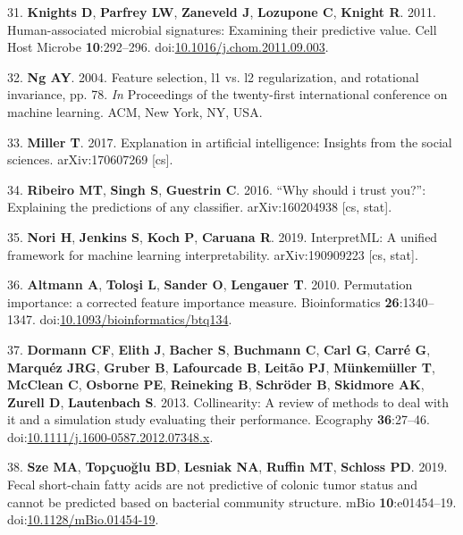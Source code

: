 \documentclass[11pt,]{article}
\begin{document}
\hypertarget{ref-knights_human-associated_2011}{}
31. \textbf{Knights D}, \textbf{Parfrey LW}, \textbf{Zaneveld J},
\textbf{Lozupone C}, \textbf{Knight R}. 2011. Human-associated microbial
signatures: Examining their predictive value. Cell Host Microbe
\textbf{10}:292--296.
doi:\href{https://doi.org/10.1016/j.chom.2011.09.003}{10.1016/j.chom.2011.09.003}.

\hypertarget{ref-Ng:2004:FSL:1015330.1015435}{}
32. \textbf{Ng AY}. 2004. Feature selection, l1 vs. l2 regularization,
and rotational invariance, pp. 78. \emph{In} Proceedings of the
twenty-first international conference on machine learning. ACM, New
York, NY, USA.

\hypertarget{ref-miller_explanation_2017}{}
33. \textbf{Miller T}. 2017. Explanation in artificial intelligence:
Insights from the social sciences. arXiv:170607269 {[}cs{]}.

\hypertarget{ref-ribeiro_why_2016}{}
34. \textbf{Ribeiro MT}, \textbf{Singh S}, \textbf{Guestrin C}. 2016.
``Why should i trust you?'': Explaining the predictions of any
classifier. arXiv:160204938 {[}cs, stat{]}.

\hypertarget{ref-nori_interpretml:_2019}{}
35. \textbf{Nori H}, \textbf{Jenkins S}, \textbf{Koch P},
\textbf{Caruana R}. 2019. InterpretML: A unified framework for machine
learning interpretability. arXiv:190909223 {[}cs, stat{]}.

\hypertarget{ref-10.1093ux2fbioinformaticsux2fbtq134}{}
36. \textbf{Altmann A}, \textbf{Toloşi L}, \textbf{Sander O},
\textbf{Lengauer T}. 2010. Permutation importance: a corrected feature
importance measure. Bioinformatics \textbf{26}:1340--1347.
doi:\href{https://doi.org/10.1093/bioinformatics/btq134}{10.1093/bioinformatics/btq134}.

\hypertarget{ref-dormann_collinearity:_2013}{}
37. \textbf{Dormann CF}, \textbf{Elith J}, \textbf{Bacher S},
\textbf{Buchmann C}, \textbf{Carl G}, \textbf{Carré G}, \textbf{Marquéz
JRG}, \textbf{Gruber B}, \textbf{Lafourcade B}, \textbf{Leitão PJ},
\textbf{Münkemüller T}, \textbf{McClean C}, \textbf{Osborne PE},
\textbf{Reineking B}, \textbf{Schröder B}, \textbf{Skidmore AK},
\textbf{Zurell D}, \textbf{Lautenbach S}. 2013. Collinearity: A review
of methods to deal with it and a simulation study evaluating their
performance. Ecography \textbf{36}:27--46.
doi:\href{https://doi.org/10.1111/j.1600-0587.2012.07348.x}{10.1111/j.1600-0587.2012.07348.x}.

\hypertarget{ref-sze_fecal_2019}{}
38. \textbf{Sze MA}, \textbf{Topçuoğlu BD}, \textbf{Lesniak NA},
\textbf{Ruffin MT}, \textbf{Schloss PD}. 2019. Fecal short-chain fatty
acids are not predictive of colonic tumor status and cannot be predicted
based on bacterial community structure. mBio \textbf{10}:e01454--19.
doi:\href{https://doi.org/10.1128/mBio.01454-19}{10.1128/mBio.01454-19}.
\end{document}
